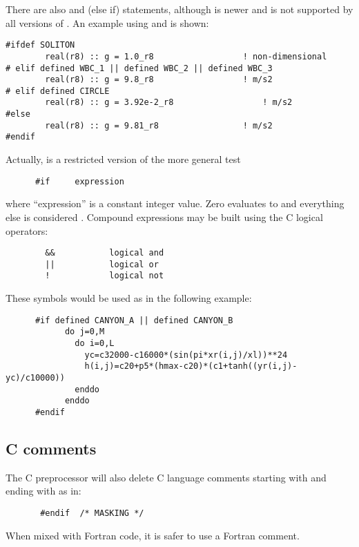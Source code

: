 There are also  and  (else if) statements,
although  is newer and is not supported by all versions of
.  An example using  and  is
shown:
\begin{verbatim}
#ifdef SOLITON
        real(r8) :: g = 1.0_r8                  ! non-dimensional
# elif defined WBC_1 || defined WBC_2 || defined WBC_3
        real(r8) :: g = 9.8_r8                  ! m/s2
# elif defined CIRCLE
        real(r8) :: g = 3.92e-2_r8                  ! m/s2
#else
        real(r8) :: g = 9.81_r8                 ! m/s2
#endif
\end{verbatim}

Actually,  is a restricted version of the more general
test
\begin{verbatim}
      #if     expression
\end{verbatim}
where ``expression'' is a constant integer value.  Zero evaluates
to  and everything else is considered .
Compound expressions may be built using the C logical operators:
\begin{verbatim}
        &&           logical and
        ||           logical or
        !            logical not
\end{verbatim}
These symbols would be used as in the following example:
\begin{verbatim}
      #if defined CANYON_A || defined CANYON_B
            do j=0,M
              do i=0,L
                yc=c32000-c16000*(sin(pi*xr(i,j)/xl))**24
                h(i,j)=c20+p5*(hmax-c20)*(c1+tanh((yr(i,j)-yc)/c10000))
              enddo
            enddo
      #endif
\end{verbatim}

\subsection{C comments}
The C preprocessor will also delete C language comments starting
with \code{/*} and ending with \code{*/} as in:
\begin{verbatim}
       #endif  /* MASKING */
\end{verbatim}
When mixed with Fortran code, it is safer to use a Fortran
comment.

